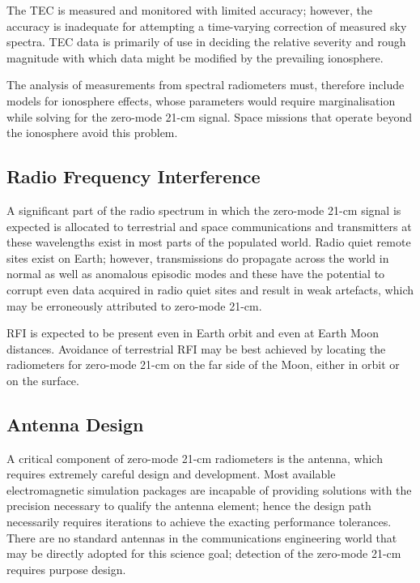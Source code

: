 The TEC is measured and monitored with limited accuracy; however, the accuracy is inadequate for attempting a time-varying correction of measured sky spectra.  TEC data is primarily of use in deciding the relative severity and rough magnitude with which data might be modified by the prevailing ionosphere.  

The analysis of measurements from spectral radiometers must, therefore include models for ionosphere effects, whose parameters would require marginalisation while solving for the zero-mode 21-cm signal.  Space missions that operate beyond the ionosphere avoid this problem.

\subsection{Radio Frequency Interference}

A significant part of the radio spectrum in which the zero-mode 21-cm signal is expected is allocated to terrestrial and space communications and transmitters at these wavelengths exist in most parts of the populated world.  Radio quiet remote sites exist on Earth; however, transmissions do propagate across the world in normal as well as anomalous episodic modes and these have the potential to corrupt even data acquired in radio quiet sites and result in weak artefacts, which may be erroneously attributed to zero-mode 21-cm.  

RFI is expected to be present even in Earth orbit and even at Earth Moon distances.  Avoidance of terrestrial RFI may be best achieved by locating the radiometers for zero-mode 21-cm on the far side of the Moon, either in orbit or on the surface.

\subsection{Antenna Design}

A critical component of zero-mode 21-cm radiometers is the antenna, which requires extremely careful design and development. Most available electromagnetic simulation packages are incapable of providing solutions with the precision necessary to qualify the antenna element; hence the design path necessarily requires iterations to achieve the exacting performance tolerances.  There are no standard antennas in the communications engineering world that may be directly adopted for this science goal; detection of the zero-mode 21-cm requires purpose design.  

